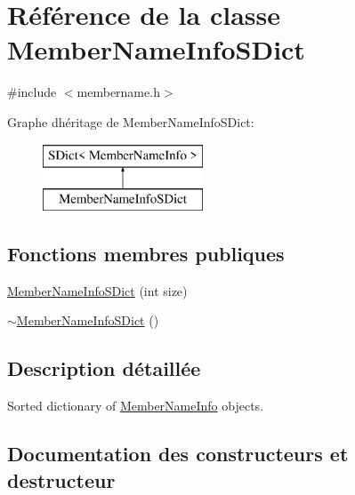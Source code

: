 \hypertarget{class_member_name_info_s_dict}{}\section{Référence de la classe Member\+Name\+Info\+S\+Dict}
\label{class_member_name_info_s_dict}


{\ttfamily \#include $<$membername.\+h$>$}

Graphe d\textquotesingle{}héritage de Member\+Name\+Info\+S\+Dict\+:\begin{figure}[H]
\begin{center}
\leavevmode
\includegraphics[height=2.000000cm]{class_member_name_info_s_dict}
\end{center}
\end{figure}
\subsection*{Fonctions membres publiques}
\begin{DoxyCompactItemize}
\item 
\hyperlink{class_member_name_info_s_dict_a04f5ce83ebb17c4785b8e90ce05c5f57}{Member\+Name\+Info\+S\+Dict} (int size)
\item 
\hyperlink{class_member_name_info_s_dict_a9298e4ddf58e1e143441315c0c55f3a3}{$\sim$\+Member\+Name\+Info\+S\+Dict} ()
\end{DoxyCompactItemize}


\subsection{Description détaillée}
Sorted dictionary of \hyperlink{class_member_name_info}{Member\+Name\+Info} objects. 

\subsection{Documentation des constructeurs et destructeur}
\hypertarget{class_member_name_info_s_dict_a04f5ce83ebb17c4785b8e90ce05c5f57}{}
